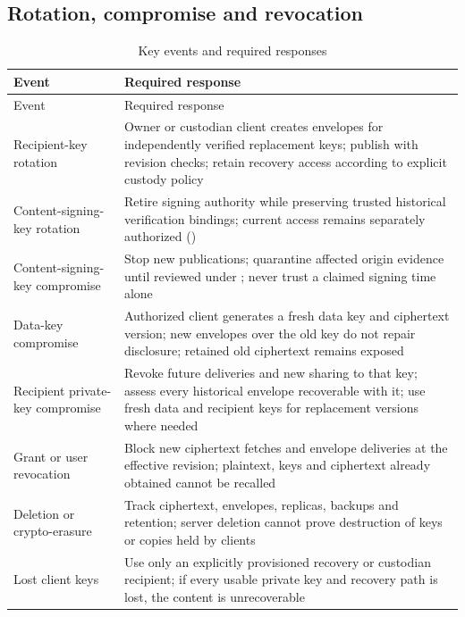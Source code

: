 \subsection{Rotation, compromise and revocation}
\begin{longtable}{@{}P{0.24\textwidth}P{0.66\textwidth}@{}}
\caption{Key events and required responses}\label{tab:rotation}\\
\toprule Event & Required response\\\midrule\endfirsthead
\toprule Event & Required response\\\midrule\endhead
Recipient-key rotation & Owner or custodian client creates envelopes for independently verified replacement keys; publish with revision checks; retain recovery access according to explicit custody policy\\
Content-signing-key rotation & Retire signing authority while preserving trusted historical verification bindings; current access remains separately authorized ()\\
Content-signing-key compromise & Stop new publications; quarantine affected origin evidence until reviewed under ; never trust a claimed signing time alone\\
Data-key compromise & Authorized client generates a fresh data key and ciphertext version; new envelopes over the old key do not repair disclosure; retained old ciphertext remains exposed\\
Recipient private-key compromise & Revoke future deliveries and new sharing to that key; assess every historical envelope recoverable with it; use fresh data and recipient keys for replacement versions where needed\\
Grant or user revocation & Block new ciphertext fetches and envelope deliveries at the effective revision; plaintext, keys and ciphertext already obtained cannot be recalled\\
Deletion or crypto-erasure & Track ciphertext, envelopes, replicas, backups and retention; server deletion cannot prove destruction of keys or copies held by clients\\
Lost client keys & Use only an explicitly provisioned recovery or custodian recipient; if every usable private key and recovery path is lost, the content is unrecoverable\\
\bottomrule
\end{longtable}
